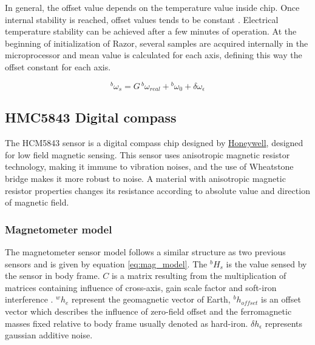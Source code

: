 In general, the offset value depends on the temperature value inside chip. Once
internal stability is reached, offset values tends to be constant \cite{Woodman2007}. Electrical
temperature stability can be achieved after a few minutes of operation. At the
beginning of initialization of Razor, several samples are acquired internally in
the microprocessor and  mean value is calculated for each axis, defining this
way the offset constant for each axis.


\begin{equation}
{}^b\omega_{s}=G\,{}^b\omega_{real} + {}^b\omega_{0} + \delta\omega_{\epsilon}
\label{eq:gyro_model}
\end{equation}

\subsection{HMC5843 Digital compass} \label{subsection:hmc5843} 

The HCM5843 sensor is a digital compass chip designed by
\href{https://www.honeywell.com}{Honeywell}, designed for low field magnetic
sensing. This sensor uses anisotropic magnetic resistor technology, making it
immune to vibration noises, and the use of Wheatstone bridge makes it more
robust to noise. A material with anisotropic magnetic resistor properties
changes its resistance according to absolute value and direction of magnetic
field. 

\subsubsection{Magnetometer model}

The magnetometer sensor model follows a similar structure as two previous
sensors and is given by equation \eqref{eq:mag_model}. The ${}^bH_{s}$ is
the value sensed by the sensor in body frame. $C$ is a matrix resulting from
the multiplication of matrices containing influence of cross-axis, gain scale
factor and soft-iron interference \cite{magAN4246}. ${}^wh_e$ represent
the geomagnetic vector of Earth, ${}^bh_{offset}$ is an offset vector which
describes the influence of zero-field offset and the ferromagnetic masses fixed
relative to body frame usually denoted as hard-iron. $\delta h_{\epsilon}$ 
represents gaussian additive noise.

